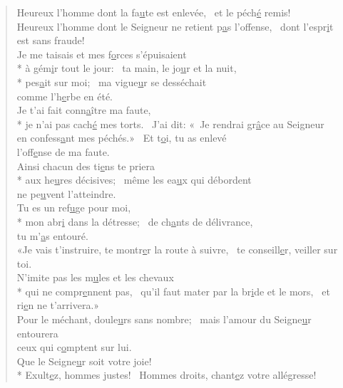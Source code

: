 
\begin{verse}
Heureux l’homme dont la fa\underline{u}te est enlevée,~\psalmstar
et le péch\underline{é} remis! \\
Heureux l’homme dont le Seigneur ne retient p\underline{a}s l’offense,~\psalmstar
dont l’espr\underline{i}t est sans fraude! \\

Je me taisais et mes f\underline{o}rces s’épuisaient \\*
à gém\underline{i}r tout le jour:~\psalmdagger
{}ta main, le jo\underline{u}r et la nuit, \\*
pes\underline{a}it sur moi;~\psalmstar
ma vigue\underline{u}r se desséchait \\
comme l’h\underline{e}rbe en été. \\

Je t’ai fait conn\underline{a}ître ma faute, \\*
je n’ai pas cach\underline{é} mes torts.~\psalmdagger
J’ai dit: « Je rendrai gr\underline{â}ce au Seigneur \\
en confess\underline{a}nt mes péchés.»~\psalmstar
Et t\underline{o}i, tu as enlevé \\
l’off\underline{e}nse de ma faute. \\

Ainsi chacun des ti\underline{e}ns te priera \\*
aux he\underline{u}res décisives;~\psalmstar
même les ea\underline{u}x qui débordent \\
ne pe\underline{u}vent l’atteindre. \\

Tu es un ref\underline{u}ge pour moi, \\*
mon abr\underline{i} dans la détresse;~\psalmstar
de ch\underline{a}nts de délivrance, \\
tu m’\underline{a}s entouré. \\

«Je vais t’instruire, te montr\underline{e}r la route à suivre,~\psalmstar
te conseill\underline{e}r, veiller sur toi. \\

N’imite pas les m\underline{u}les et les chevaux \\*
qui ne compr\underline{e}nnent pas,~\psalmdagger
qu’il faut mater par la br\underline{i}de et le mors,~\psalmstar
et ri\underline{e}n ne t’arrivera.» \\

Pour le méchant, doule\underline{u}rs sans nombre;~\psalmstar
mais l’amour du Seigne\underline{u}r entourera \\
ceux qui c\underline{o}mptent sur lui. \\

Que le Seigne\underline{u}r soit votre joie! \\*
Exult\underline{e}z, hommes justes!~\psalmstar
Hommes droits, chant\underline{e}z votre allégresse! \\
\end{verse}

